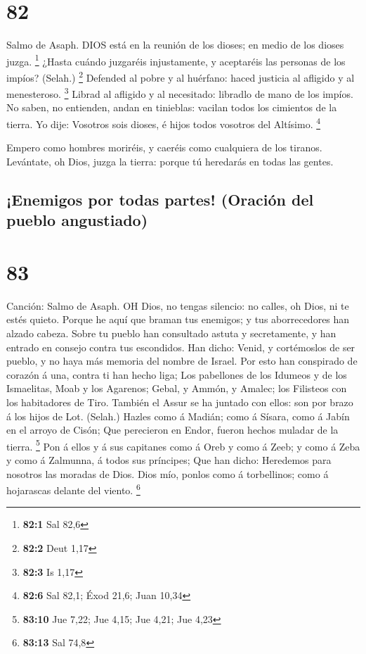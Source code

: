 \hypertarget{section-81}{%
\section{82}\label{section-81}}

 Salmo de Asaph. DIOS está en la reunión de los dioses; en
medio de los dioses juzga. \footnote{\textbf{82:1} Sal 82,6}
 ¿Hasta cuándo juzgaréis injustamente, y aceptaréis las
personas de los impíos? (Selah.) \footnote{\textbf{82:2} Deut 1,17}
 Defended al pobre y al huérfano: haced justicia al afligido
y al menesteroso. \footnote{\textbf{82:3} Is 1,17}  Librad
al afligido y al necesitado: libradlo de mano de los impíos.
 No saben, no entienden, andan en tinieblas: vacilan todos
los cimientos de la tierra.  Yo dije: Vosotros sois dioses,
é hijos todos vosotros del Altísimo. \footnote{\textbf{82:6} Sal 82,1;
  Éxod 21,6; Juan 10,34}

 Empero como hombres moriréis, y caeréis como cualquiera de
los tiranos.  Levántate, oh Dios, juzga la tierra: porque tú
heredarás en todas las gentes.

\hypertarget{enemigos-por-todas-partes-oraciuxf3n-del-pueblo-angustiado}{%
\subsection{¡Enemigos por todas partes! (Oración del pueblo
angustiado)}\label{enemigos-por-todas-partes-oraciuxf3n-del-pueblo-angustiado}}

\hypertarget{section-82}{%
\section{83}\label{section-82}}

 Canción: Salmo de Asaph. OH Dios, no tengas silencio: no
calles, oh Dios, ni te estés quieto.  Porque he aquí que
braman tus enemigos; y tus aborrecedores han alzado cabeza. 
Sobre tu pueblo han consultado astuta y secretamente, y han entrado en
consejo contra tus escondidos.  Han dicho: Venid, y
cortémoslos de ser pueblo, y no haya más memoria del nombre de Israel.
 Por esto han conspirado de corazón á una, contra ti han
hecho liga;  Los pabellones de los Idumeos y de los
Ismaelitas, Moab y los Agarenos;  Gebal, y Ammón, y Amalec;
los Filisteos con los habitadores de Tiro.  También el Assur
se ha juntado con ellos: son por brazo á los hijos de Lot. (Selah.)
 Hazles como á Madián; como á Sísara, como á Jabín en el
arroyo de Cisón;  Que perecieron en Endor, fueron hechos
muladar de la tierra. \footnote{\textbf{83:10} Jue 7,22; Jue 4,15; Jue
  4,21; Jue 4,23}  Pon á ellos y á sus capitanes como á
Oreb y como á Zeeb; y como á Zeba y como á Zalmunna, á todos sus
príncipes;  Que han dicho: Heredemos para nosotros las
moradas de Dios.  Dios mío, ponlos como á torbellinos; como
á hojarascas delante del viento. \footnote{\textbf{83:13} Sal 74,8}

